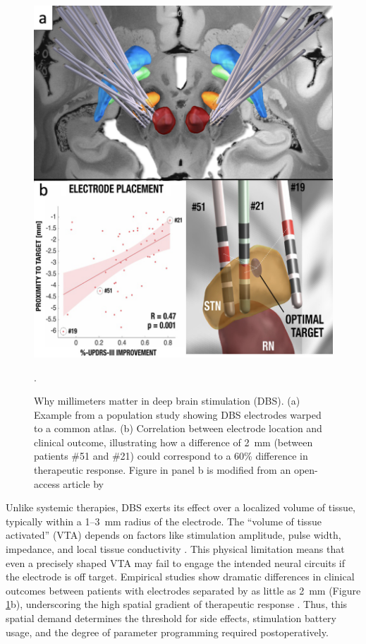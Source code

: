 \begin{figure}[hbt!]
    \centering
    \includegraphics[width=1\linewidth]{figs/ch1_Figure_whymm2.png}
    \caption{Why millimeters matter in deep brain stimulation (DBS). (a) Example from a population study showing DBS electrodes warped to a common atlas. (b) Correlation between electrode location and clinical outcome, illustrating how a difference of 2~mm (between patients \#51 and \#21) could correspond to a 60\% difference in therapeutic response. Figure in panel b is modified from an open-access article by \cite{Horn2018-qq}}.
    \label{fig:ch1_Figure_whymm}
\end{figure}

Unlike systemic therapies, DBS exerts its effect over a localized volume of tissue, typically within a 1–3~mm radius of the electrode. The “volume of tissue activated” (VTA) depends on factors like stimulation amplitude, pulse width, impedance, and local tissue conductivity \cite{McIntyre2006-wh,Butson2007-bn}. This physical limitation means that even a precisely shaped VTA may fail to engage the intended neural circuits if the electrode is off target. Empirical studies show dramatic differences in clinical outcomes between patients with electrodes separated by as little as 2~mm (Figure \ref{fig:ch1_Figure_whymm}b), underscoring the high spatial gradient of therapeutic response \cite{Horn2018-qq, Maks2009-ci}. Thus, this spatial demand determines the threshold for side effects, stimulation battery usage, and the degree of parameter programming required postoperatively. 

